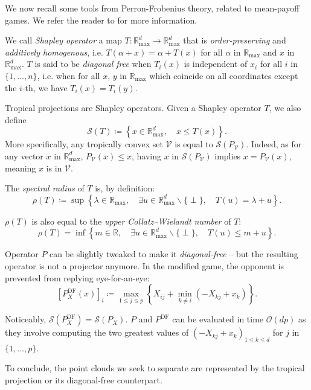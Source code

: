 \documentclass[oneside,UKenglish,a4paper]{amsart}
\numberwithin{equation}{section}
\numberwithin{figure}{section}
\theoremstyle{plain}
\theoremstyle{definition}
\theoremstyle{plain}
\theoremstyle{remark}
\theoremstyle{plain}
\theoremstyle{definition}
\theoremstyle{definition}
\begin{document}
We now recall some tools from Perron-Frobenius theory, related to mean-payoff games. We refer the reader to \cite{AKIAN2012} for more
information.

We call \emph{Shapley operator} a map $T:\mathbb{R}_{\max}^{d}\rightarrow\mathbb{R}_{\max}^{d}$
that is \emph{order-preserving} and \emph{additively homogenous}, i.e. $T(\alpha+x)=\alpha+T(x)$
for all $\alpha$ in $\mathbb{R}_{\max}$ and $x$ in $\mathbb{R}_{\max}^{d}$. $T$ is said to be \emph{diagonal free} when $T_{i}(x)$
is independent of $x_{i}$ for all $i$ in $\{1,\ldots, n\}$, i.e. when for all $x$, $y$ in $\mathbb{R}_{\max}$ which coincide on all coordinates except the $i$-th, we have $T_{i}(x)=T_{i}(y)$. 

Tropical projections are Shapley operators. Given a Shapley operator $T$, we also define
\[
\mathcal{S}(T)\coloneqq\left\{x\in\mathbb{R}_{\max}^{d},\quad x\le T(x)\right\}.
\]
More specifically, any tropically convex set $\mathcal{V}$ is equal
to $\mathcal{S}(P_{\mathcal{V}})$. Indeed, as for any vector $x$ in $\mathbb{R}_{\text{max}}^{d}$,
$P_{\mathcal{V}}(x)\le x$, having $x$ in $\mathcal{S}(P_{\mathcal{V}})$
implies $x=P_{\mathcal{V}}(x)$, meaning $x$ is in
$\mathcal{V}$.


The \emph{spectral radius} of $T$
is, by definition: \cite{Allamigeon2018}
\[
\rho(T)\coloneqq\sup\left\{\lambda\in\mathbb{R}_{\max},\quad\exists u\in\mathbb{R}_{\max}^{d}\backslash\{\perp\},\quad T(u)=\lambda+u\right\}.
\]

$\rho(T)$ is also equal to the \emph{upper Collatz–Wielandt number} of $T$: \cite{Allamigeon2018}
\begin{equation}\label{eq:Collatz}
\rho(T) = \inf \left \{m\in \mathbb{R}, \quad\exists u\in\mathbb{R}_{\max}^{d}\backslash\{\perp\},\quad T(u) \le m + u \right \}.
\end{equation}


Operator $P$ can be slightly tweaked to make it \emph{diagonal-free} -- but the resulting operator is not a projector anymore.
In the modified game, the opponent is prevented from replying eye-for-an-eye:
\[
\left[P^{\text{DF}}_X(x)\right]_{i}\coloneqq\max_{1\le j\le p}\left\{ X_{ij}+\min_{k\ne i}(-X_{kj}+x_{k})\right\} .
\]

Noticeably, $\mathcal{S}(P_X^\text{DF}) = \mathcal{S}(P_X)$. $P$ and $P^\text{DF}$ can be evaluated in time $\mathcal{O}(dp)$ as they involve computing the two greatest values of $(-X_{kj}+x_k)_{1 \le k \le d}$ for $j$ in $\{1,\ldots, p\}$.

To conclude, the point clouds we seek to separate are represented by the tropical projection or its diagonal-free counterpart.
\end{document}

